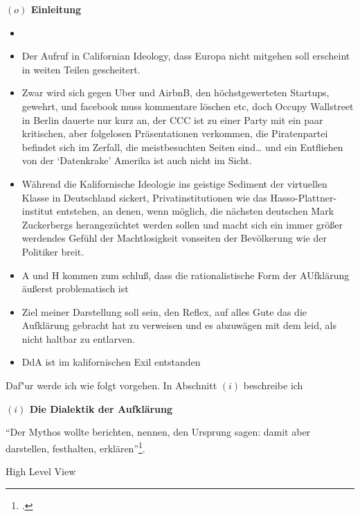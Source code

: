 \documentclass[a4paper, 12pt]{article}
\begin{document}
\begin{onehalfspace} 

\noindent\textbf{$(o)$ Einleitung}

\noindent %

\begin{itemize}
  \item 
  \item Der Aufruf in Californian Ideology, dass Europa nicht mitgehen soll erscheint in weiten Teilen gescheitert. 
  \item Zwar wird sich gegen Uber und AirbnB, den höchstgewerteten Startups, gewehrt, und facebook muss kommentare löschen etc, doch Occupy Wallstreet in Berlin dauerte nur kurz an, der CCC ist zu einer Party mit ein paar kritischen, aber folgelosen Präsentationen verkommen, die Piratenpartei befindet sich im Zerfall, die meistbesuchten Seiten sind… und ein Entfliehen von der ‘Datenkrake’ Amerika ist auch nicht im Sicht. 
\item Während die Kalifornische Ideologie ins geistige Sediment der virtuellen Klasse in Deutschland sickert, Privatinstitutionen wie das Hasso-Plattner-institut entstehen, an denen, wenn möglich, die nächsten deutschen Mark Zuckerbergs herangezüchtet werden sollen und macht sich ein immer größer werdendes Gefühl der Machtlosigkeit vonseiten der Bevölkerung wie der Politiker breit.
\item A und H kommen zum schluß, dass die rationalistische Form der AUfklärung äußerst problematisch ist
\item Ziel meiner Darstellung soll sein, den Reflex, auf alles Gute das die Aufklärung gebracht hat zu verweisen und es abzuwägen mit dem leid, als nicht haltbar zu entlarven.
\item DdA ist im kalifornischen Exil entstanden
\end{itemize}


Daf"ur werde ich wie folgt vorgehen. In Abschnitt $(i)$ beschreibe ich 
\vspace{5mm}

\noindent\textbf{$(i)$ Die Dialektik der Aufklärung}

\noindent "`Der Mythos wollte berichten, nennen, den Ursprung sagen: damit aber darstellen, festhalten, erklären"'\footnote{\Cite[Siehe][S. 14]{dialektik-der-aufklaerung}.}.

High Level View


\end{onehalfspace}
\end{document}
